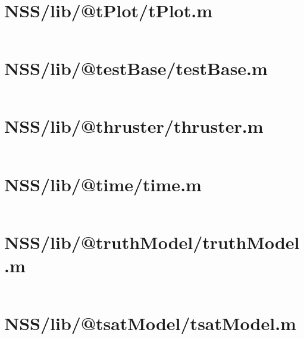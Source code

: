 \pagebreak
\section*{NSS/lib/@tPlot/tPlot.m}\label{code:NSS/lib/@tPlot/tPlot.m}
\inputminted[linenos,fontsize=\scriptsize]{matlab}{/home/dcouture/git/mathyourlife/TSatPy/beta_versions/matlab_object_oriented/lib/@tPlot/tPlot.m}

\pagebreak
\section*{NSS/lib/@testBase/testBase.m}\label{code:NSS/lib/@testBase/testBase.m}
\inputminted[linenos,fontsize=\scriptsize]{matlab}{/home/dcouture/git/mathyourlife/TSatPy/beta_versions/matlab_object_oriented/lib/@testBase/testBase.m}

\pagebreak
\section*{NSS/lib/@thruster/thruster.m}\label{code:NSS/lib/@thruster/thruster.m}
\inputminted[linenos,fontsize=\scriptsize]{matlab}{/home/dcouture/git/mathyourlife/TSatPy/beta_versions/matlab_object_oriented/lib/@thruster/thruster.m}

\pagebreak
\section*{NSS/lib/@time/time.m}\label{code:NSS/lib/@time/time.m}
\inputminted[linenos,fontsize=\scriptsize]{matlab}{/home/dcouture/git/mathyourlife/TSatPy/beta_versions/matlab_object_oriented/lib/@time/time.m}

\pagebreak
\section*{NSS/lib/@truthModel/truthModel.m}\label{code:NSS/lib/@truthModel/truthModel.m}
\inputminted[linenos,fontsize=\scriptsize]{matlab}{/home/dcouture/git/mathyourlife/TSatPy/beta_versions/matlab_object_oriented/lib/@truthModel/truthModel.m}

\pagebreak
\section*{NSS/lib/@tsatModel/tsatModel.m}\label{code:NSS/lib/@tsatModel/tsatModel.m}
\inputminted[linenos,fontsize=\scriptsize]{matlab}{/home/dcouture/git/mathyourlife/TSatPy/beta_versions/matlab_object_oriented/lib/@tsatModel/tsatModel.m}

